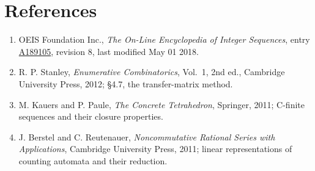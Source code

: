 \documentclass[11pt]{article}
\theoremstyle{definition}
\begin{document}
\section{References}

\begin{enumerate}

\item OEIS Foundation Inc., \emph{The On-Line Encyclopedia of Integer Sequences}, entry \href{https://oeis.org/A189105}{A189105}, revision 8, last modified May 01 2018.

\item R. P. Stanley, \emph{Enumerative Combinatorics}, Vol.~1, 2nd ed., Cambridge University Press, 2012; \S4.7, the transfer-matrix method.

\item M. Kauers and P. Paule, \emph{The Concrete Tetrahedron}, Springer, 2011; C-finite sequences and their closure properties.

\item J. Berstel and C. Reutenauer, \emph{Noncommutative Rational Series with Applications}, Cambridge University Press, 2011; linear representations of counting automata and their reduction.

\end{enumerate}
\end{document}
